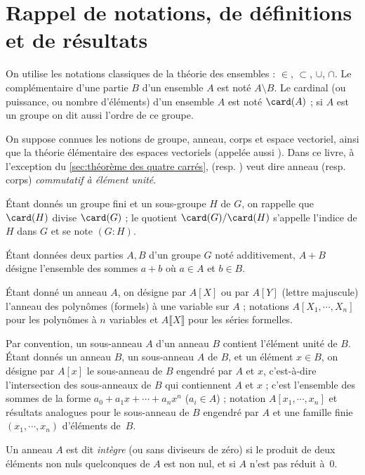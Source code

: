 \documentclass[11pt, useosf,
  title in boldface,
  theorem in new line,
  theorem numbering = section,
  number theorems separately,
]{simplivre}
\begin{document}
\chapter{Rappel de notations, de définitions et de résultats}

    On utilise les notations classiques de la théorie des ensembles : \( \in \), \( \subset \), \( \cup \), \( \cap \). Le complémentaire d'une partie \( B \) d'un ensemble \( A \) est noté \( A \setminus B \). Le cardinal (ou puissance, ou nombre d'éléments) d'un ensemble \( A \) est noté \( \card(A) \) ; si \( A \) est un groupe on dit aussi l'ordre de ce groupe.

    On suppose connues les notions de groupe, anneau, corps et espace vectoriel, ainsi que la théorie élémentaire des espaces vectoriels (appelée aussi ). Dans ce livre, à l'exception du \cref{sec:théorème des quatre carrés},  (resp. ) veut dire anneau (resp. corps) \emph{commutatif à élément unité}.

    Étant donnés un groupe fini et un sous-groupe \( H \) de \( G \), on rappelle que \( \card(H) \) divise \( \card(G) \) ; le quotient \( \card(G)/\card(H) \) s'appelle l'indice de \( H \) dans \( G \) et se note \( (G:H) \).

    Étant données deux parties \( A , B \) d'un groupe \( G \) noté additivement, \( A+B \) désigne l'ensemble des sommes \( a+b \) où \( a \in A \) et \( b \in B \).

    Étant donné un anneau \( A \), on désigne par \( A[X] \) ou par \( A[Y] \) (lettre majuscule) l'anneau des polynômes (formels) à une variable sur \( A \) ; notations \( A[X_1, \cdots, X_n] \) pour les polynômes à \( n \) variables et \( A\lBrack X \rBrack \) pour les séries formelles.

    Par convention, un sous-anneau \( A \) d'un anneau \( B \) contient l'élément unité de \( B \). Étant donnés un anneau \( B \), un sous-anneau \( A \) de \( B \), et un élément \( x \in B \), on désigne par \( A[x] \) le sous-anneau de \( B \) engendré par \( A \) et \( x \), c'est-à-dire l'intersection des sous-anneaux de \( B \) qui contiennent \( A \) et \( x \) ; c'est l'ensemble des sommes de la forme \( a_0 + a_1 x + \cdots + a_n x^n \) (\( a_i \in A \)) ; notation \( A[x_1, \cdots, x_n] \) et résultats analogues pour le sous-anneau de \( B \) engendré par \( A \) et une famille finie \( (x_1, \cdots, x_n) \) d'éléments de~\( B \).

    Un anneau \( A \) est dit \emph{intègre} (ou sans diviseurs de zéro) si le produit de deux éléments non nuls quelconques de \( A \) est non nul, et si \( A \) n'est pas réduit à~\( 0 \).
\end{document}
